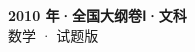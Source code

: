 \documentclass[zihao=-4, a4paper]{ctexart}
\begin{document}
\begin{center}
  {\Large\bfseries 2010 年·全国大纲卷Ⅰ·文科}\\[4pt]
  {\large 数学 · 试题版}
\end{center}
\medskip
{}

\end{document}
